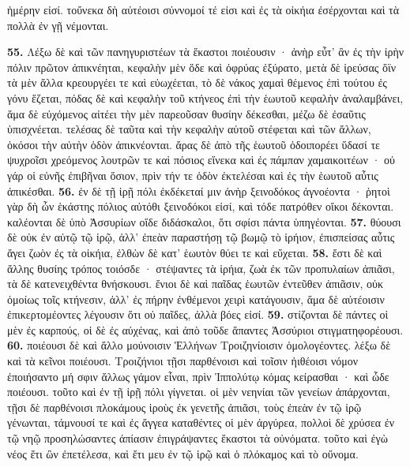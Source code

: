 \documentclass[a4paper, 11pt, oneside, polutonikogreek, german]{article}
\begin{document}
ἡμέρην εἰσί. τοὔνεκα δὴ αὐτέοισι σύννομοί τέ εἰσι καὶ ἐς τὰ οἰκήια ἐσέρχονται καὶ τὰ πολλὰ ἐν γῇ νέμονται.

\textbf{55.} Λέξω δὲ καὶ τῶν πανηγυριστέων τὰ ἕκαστοι ποιέουσιν · ἀνὴρ εὖτ' ἂν ἐς τὴν ἱρὴν πόλιν πρῶτον ἀπικνέηται, κεφαλὴν μὲν ὅδε καὶ ὀφρύας ἐξύρατο, μετὰ δὲ ἱρεύσας ὄϊν τὰ μὲν ἄλλα κρεουργέει τε καὶ εὐωχέεται, τὸ δὲ νάκος χαμαὶ θέμενος ἐπὶ τούτου ἐς γόνυ ἕζεται, πόδας δὲ καὶ κεφαλὴν τοῦ κτήνεος ἐπὶ τὴν ἑωυτοῦ κεφαλὴν ἀναλαμβάνει, ἅμα δὲ εὐχόμενος αἰτέει τὴν μὲν παρεοῦσαν θυσίην δέκεσθαι, μέζω δὲ ἐσαῦτις ὑπισχνέεται. τελέσας δὲ ταῦτα καὶ τὴν κεφαλὴν αὐτοῦ στέφεται καὶ τῶν ἄλλων, ὁκόσοι τὴν αὐτὴν ὁδὸν ἀπικνέονται. ἄρας δὲ ἀπὸ τῆς ἑωυτοῦ ὁδοιπορέει ὕδασί τε ψυχροῖσι χρεόμενος λουτρῶν τε καὶ πόσιος εἵνεκα καὶ ἐς πάμπαν χαμαικοιτέων · οὐ γάρ οἱ εὐνῆς ἐπιβῆναι ὅσιον, πρὶν τήν τε ὁδὸν ἐκτελέσαι καὶ ἐς τὴν ἑωυτοῦ αὖτις ἀπικέσθαι. \textbf{56.} ἐν δὲ τῇ ἱρῇ πόλι ἐκδέκεταί μιν ἀνὴρ ξεινοδόκος ἀγνοέοντα · ῥητοὶ γὰρ δὴ ὦν ἑκάστης πόλιος αὐτόθι ξεινοδόκοι εἰσί, καὶ τόδε πατρόθεν οἴκοι δέκονται. καλέονται δὲ ὑπὸ Ἀσσυρίων οἵδε διδάσκαλοι, ὅτι σφίσι πάντα ὑπηγέονται. \textbf{57.} θύουσι δὲ οὐκ ἐν αὐτῷ τῷ ἱρῷ, ἀλλ' ἐπεὰν παραστήσῃ τῷ βωμῷ τὸ ἱρήιον, ἐπισπείσας αὖτις ἄγει ζωὸν ἐς τὰ οἰκήια, ἐλθὼν δὲ κατ' ἑωυτὸν θύει τε καὶ εὔχεται. \textbf{58.} ἔστι δὲ καὶ ἄλλης θυσίης τρόπος τοιόσδε · στέψαντες τὰ ἱρήια, ζωὰ ἐκ τῶν προπυλαίων ἀπιᾶσι, τὰ δὲ κατενειχθέντα θνήσκουσι. ἔνιοι δὲ καὶ παῖδας ἑωυτῶν ἐντεῦθεν ἀπιᾶσιν, οὐκ ὁμοίως τοῖς κτήνεσιν, ἀλλ' ἐς πήρην ἐνθέμενοι χειρὶ κατάγουσιν, ἅμα δὲ αὐτέοισιν ἐπικερτομέοντες λέγουσιν ὅτι οὐ παῖδες, ἀλλὰ βόες εἰσί. \textbf{59.} στίζονται δὲ πάντες οἱ μὲν ἐς καρπούς, οἱ δὲ ἐς αὐχένας, καὶ ἀπὸ τοῦδε ἅπαντες Ἀσσύριοι στιγματηφορέουσι. \textbf{60.} ποιέουσι δὲ καὶ ἄλλο μούνοισιν Ἑλλήνων Τροιζηνίοισιν ὁμολογέοντες. λέξω δὲ καὶ τὰ κεῖνοι ποιέουσι. Τροιζήνιοι τῇσι παρθένοισι καὶ τοῖσιν ἠιθέοισι νόμον ἐποιήσαντο μή σφιν ἄλλως γάμον εἶναι, πρὶν Ἱππολύτῳ κόμας κείρασθαι · καὶ ὧδε ποιέουσι. τοῦτο καὶ ἐν τῇ ἱρῇ πόλι γίγνεται. οἱ μὲν νεηνίαι τῶν γενείων ἀπάρχονται, τῇσι δὲ παρθένοισι πλοκάμους ἱροὺς ἐκ γενετῆς ἀπιᾶσι, τοὺς ἐπεὰν ἐν τῷ ἱρῷ γένωνται, τάμνουσί τε καὶ ἐς ἄγγεα καταθέντες οἱ μὲν ἀργύρεα, πολλοὶ δὲ χρύσεα ἐν τῷ νηῷ προσηλώσαντες ἀπίασιν ἐπιγράψαντες ἕκαστοι τὰ οὐνόματα. τοῦτο καὶ ἐγὼ νέος ἔτι ὢν ἐπετέλεσα, καὶ ἔτι μευ ἐν τῷ ἱρῷ καὶ ὁ πλόκαμος καὶ τὸ οὔνομα.
\clearpage
\end{document}
